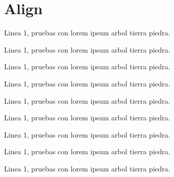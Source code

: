 
\lipsum[6]

\lipsum[6]

\lipsum[6]

\lipsum[6]

\lipsum[4]


\insertequation[\label{arg1}]{arg2}
\insertequationcaptioned[\label{arg2}]{arg2}{}

\newpage
\section{Align}
Linea 1, pruebas con lorem ipsum arbol tierra piedra.


Linea 1, pruebas con lorem ipsum arbol tierra piedra.


Linea 1, pruebas con lorem ipsum arbol tierra piedra.

\insertalign[\label{align1}]{arg2}

Linea 1, pruebas con lorem ipsum arbol tierra piedra.


Linea 1, pruebas con lorem ipsum arbol tierra piedra.


Linea 1, pruebas con lorem ipsum arbol tierra piedra.


Linea 1, pruebas con lorem ipsum arbol tierra piedra.

\insertaligncaptioned[\label{align3}]{arg2}{}

Linea 1, pruebas con lorem ipsum arbol tierra piedra.


Linea 1, pruebas con lorem ipsum arbol tierra piedra.

